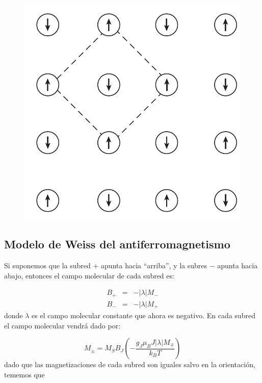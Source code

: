 \documentclass[12pt,a4paper]{book}
\numberwithin{equation}{section}
\numberwithin{figure}{section}
\newcommand{\parentesis}[1]{\left( #1  \right)}
\begin{document}
\begin{figure}[h!]
    \centering
    \includegraphics[scale=0.6]{05-Subred.png}
    \caption{}
    \label{Fig:05-02-01}
\end{figure}

\subsection{Modelo de Weiss del antiferromagnetismo}

Si suponemos que la subred $+$ apunta hacia ``arriba'', y la subres $-$ apunta hacia abajo, entonces el campo molecular de cada subred es:

\begin{equation}
    \begin{array}{lll}
        B_+ & = & - |\lambda|M_{-}  \\
        B_{-} & = & - |\lambda|M_+ 
    \end{array}
\end{equation}
donde $\lambda$ es el campo molecular constante que ahora es negativo. En cada subred el campo molecular vendrá dado por:

\begin{equation}
    M_\pm = M_S B_J \parentesis{- \frac{g_J \mu_B J |\lambda | M_\mp}{k_B T}}
\end{equation}
dado que las magnetizaciones de cada subred son iguales salvo en la orientación, tememos que
\end{document}

